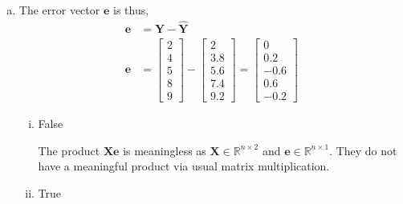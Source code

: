 \documentclass[12pt,letterpaper, onecolumn]{exam}
\begin{document}
\begin{questions}
\begin{solution}
\begin{enumerate}[a.)]
        \item The error vector $\textbf{e}$ is thus,
        \begin{align*}
            \textbf{e}&=\textbf{Y}- \hat{\textbf{Y}} \\
            \textbf{e} & = \left[\begin{array}{c}
                2  \\
                4  \\
                5  \\
                8  \\
                9 
            \end{array} \right] - \left[\begin{array}{c}
                2  \\
                3.8  \\
                5.6  \\
                7.4  \\
                9.2 
            \end{array} \right] = \left[\begin{array}{c}
                0  \\
                0.2  \\
                -0.6  \\
                0.6  \\
                -0.2 
            \end{array} \right]
        \end{align*}

        \begin{enumerate}[i.)]
            \item False 

            The product $\textbf{Xe}$ is meaningless as $\textbf{X}\in\mathbb{R}^{n\times 2}$ and $\textbf{e}\in\mathbb{R}^{n\times 1}$. They do not have a meaningful product via usual matrix multiplication.

            \item True


\end{enumerate}
\end{enumerate}
\end{solution}
\end{questions}
\end{document}
